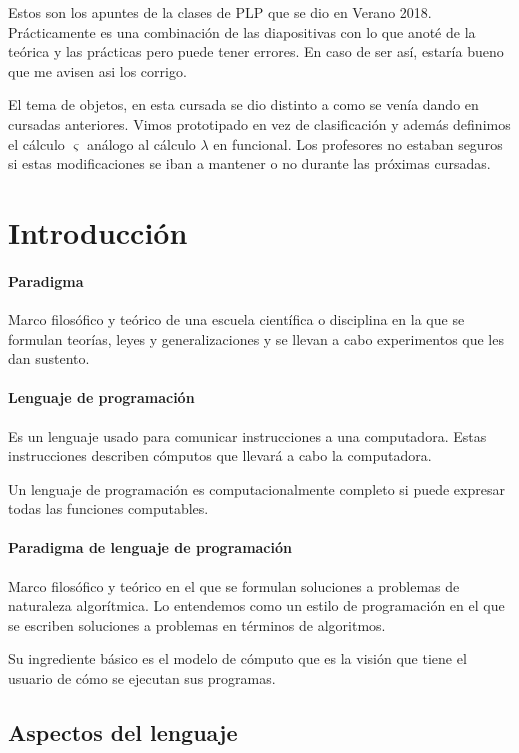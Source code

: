 Estos son los apuntes de la clases de PLP que se dio en Verano 2018. Prácticamente es una combinación de las diapositivas con lo que anoté de la teórica y las prácticas pero puede tener errores. En caso de ser así, estaría bueno que me avisen asi los corrigo. 

El tema de objetos, en esta cursada se dio distinto a como se venía dando en cursadas anteriores. Vimos prototipado en vez de clasificación y además definimos el cálculo $\varsigma$ análogo al cálculo $\lambda$ en funcional. Los profesores no estaban seguros si estas modificaciones se iban a mantener o no durante las próximas cursadas.

\section{Introducción}

\paragraph{Paradigma} Marco filosófico y teórico de una escuela científica o disciplina en la que se formulan teorías, leyes y generalizaciones y se llevan a cabo experimentos que les dan sustento.

\paragraph{Lenguaje de programación} Es un lenguaje usado para comunicar instrucciones a una computadora. Estas instrucciones describen cómputos que llevará a cabo la computadora.

Un lenguaje de programación es computacionalmente completo si puede expresar todas las funciones computables.

\paragraph{Paradigma de lenguaje de programación} Marco filosófico y teórico en el que se formulan soluciones a problemas de naturaleza algorítmica. Lo entendemos como un estilo de programación en el que se escriben soluciones a problemas en términos de algoritmos.

Su ingrediente básico es el modelo de cómputo que es la visión que tiene el usuario de cómo se ejecutan sus programas.

\subsection{Aspectos del lenguaje}

